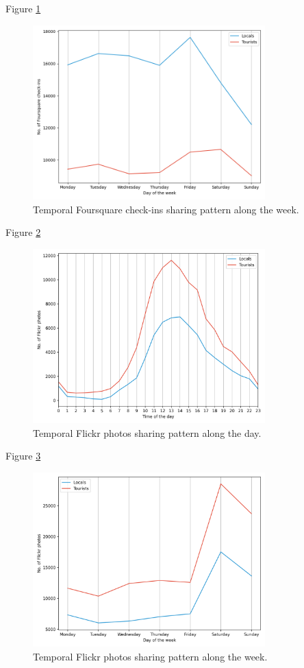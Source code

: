 \documentclass{article}
\begin{document}
Figure \ref{fig:foursquare_trend_week}
\begin{figure}
\centering
\includegraphics[width=0.8\textwidth]{figures/foursquare_trend_week.png}
\caption{\label{fig:foursquare_trend_week}Temporal Foursquare check-ins sharing pattern along the week.}
\end{figure}


Figure \ref{fig:flickr_trend_day}
\begin{figure}
\centering
\includegraphics[width=0.8\textwidth]{figures/flickr_trend_day.png}
\caption{\label{fig:flickr_trend_day}Temporal Flickr photos sharing pattern along the day.}
\end{figure}

Figure \ref{fig:flickr_trend_week}
\begin{figure}
\centering
\includegraphics[width=0.8\textwidth]{figures/flickr_trend_week.png}
\caption{\label{fig:flickr_trend_week}Temporal Flickr photos sharing pattern along the week.}
\end{figure}
\newpage
\end{document}
